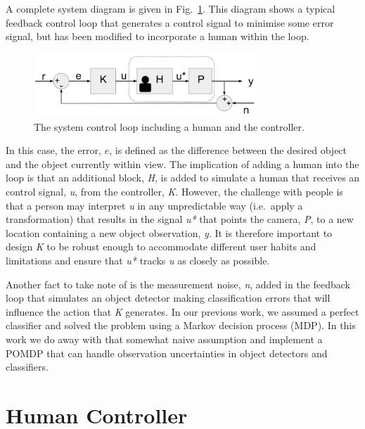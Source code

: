 \documentclass[runningheads]{llncs}
\newcommand\todo[1]{\textcolor{red}{#1}}
\begin{document}
A complete system diagram is given in Fig.~\ref{fig:sys-diagram}. 
This diagram shows a typical feedback control loop that generates a control signal to minimise some error signal, but has been modified to incorporate a human within the loop.

\begin{figure}
  \centering
  \includegraphics[width=0.75\textwidth]{figures/control_loop.png}
  \caption{The system control loop including a human and the controller.}\label{fig:sys-diagram}
\end{figure}

In this case, the error, $e$, is defined as the difference between the desired object and the object currently within view. 
The implication of adding a human into the loop is that an additional block, \emph{H}, is added to simulate a human that receives an control signal, \emph{u}, from the controller, \emph{K}. 
However, the challenge with people is that a person may interpret \emph{u} in any unpredictable way (i.e.\ apply a transformation) that results in the signal \emph{u*} that points the camera, \emph{P}, to a new location containing a new object observation, \emph{y}.
It is therefore important to design \emph{K} to be robust enough to accommodate different user habits and limitations and ensure that \emph{u*} tracks \emph{u} as closely as possible. 

Another fact to take note of is the measurement noise, \emph{n}, added in the feedback loop that simulates an object detector making classification errors that will influence the action that \emph{K} generates. 
In our previous work, we assumed a perfect classifier and solved the problem using a Markov decision process (MDP). 
In this work we do away with that somewhat naive assumption and implement a POMDP that can handle observation uncertainties in object detectors and classifiers. 

\section{Human Controller}\label{sec:human-controller}
\end{document}
